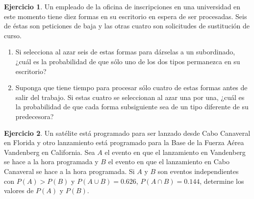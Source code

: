 \documentclass[
  11pt,
]{book}
\theoremstyle{definition}
\theoremstyle{definition}
\theoremstyle{definition}
\newtheorem{exercise}{Ejercicio}[chapter]
\theoremstyle{definition}
\theoremstyle{remark}
\begin{document}
\begin{exercise}

Un empleado de la oficina de inscripciones en una universidad en este momento tiene diez formas en su escritorio en espera de ser procesadas. Seis de éstas son peticiones de baja y las otras cuatro son solicitudes de sustitución de curso.

\begin{enumerate}
\def\labelenumi{\alph{enumi}.}
\item
  Si selecciona al azar seis de estas formas para dárselas a un subordinado, ¿cuál es la probabilidad de que sólo uno de los dos tipos permanezca en su escritorio?
\item
  Suponga que tiene tiempo para procesar sólo cuatro de estas formas antes de salir del trabajo. Si estas cuatro se seleccionan al azar una por una, ¿cuál es la probabilidad de que cada forma subsiguiente sea de un tipo diferente de su predecesora?\\
\end{enumerate}

\end{exercise}

\begin{exercise}
Un satélite está programado para ser lanzado desde Cabo Canaveral en Florida y otro lanzamiento está programado para la Base de la Fuerza Aérea Vandenberg en California. Sea \(A\) el evento en que el lanzamiento en Vandenberg se hace a la hora programada y \(B\) el evento en que el lanzamiento en Cabo Canaveral se hace a la hora programada. Si \(A\) y \(B\) son eventos independientes con \(P(A) > P(B)\) y \(P(A \cup B) = 0.626\), \(P(A \cap B) = 0.144\), determine los valores de \(P(A)\) y \(P(B)\).
\end{exercise}
\end{document}
